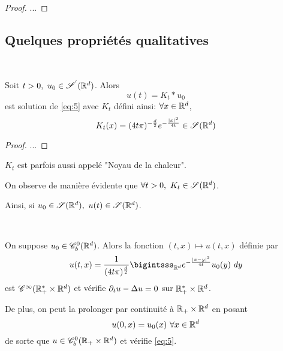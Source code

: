\documentclass[french,a4paper,10pt]{article}
\begin{document}
            \begin{proof}
                ...
            \end{proof}

        \subsection{Quelques propriétés qualitatives}\label{subsec:3.3}
            \begin{theorem} \label{thm:3.3.1}~
            
                Soit $t>0, \ u_0\in \mathscr{S}^{'}(\mathbb{R}^d)$. Alors
                \begin{equation*}
                    u(t) = K_t \ast u_0
                \end{equation*}
                est solution de \eqref{eq:5} avec $K_t$ défini ainsi: $\forall x \in \mathbb{R}^d$,
                \begin{equation*}
                    K_t(x)= (4t\pi)^{-\frac{d}{2}}e^{-\frac{\mathopen{}\left|x\right|\mathclose{}^2}{4t}} \in \mathscr{S} (\mathbb{R}^d)
                \end{equation*}
            \end{theorem}

            \begin{proof}
                ...
            \end{proof}

            \begin{remark}\label{rem:3.3.2}
                $K_t$ est parfois aussi appelé "Noyau de la chaleur".
            \end{remark}

            \begin{remark}\label{rem:3.3.3}
                On observe de manière évidente que $\forall t>0, \ K_t \in \mathscr{S}(\mathbb{R}^d)$.

                Ainsi, si $u_0 \in \mathscr{S}(\mathbb{R}^d), \ u(t) \in \mathscr{S}(\mathbb{R}^d)$.
            \end{remark}

            \begin{proposition}\ \label{prop:3.3.4}
            
                On suppose $u_0 \in \mathscr{C}^0_b(\mathbb{R}^d)$. Alors la fonction $(t,x) \mapsto  u(t,x)$ définie par 
                \begin{equation*}
                    u(t,x) = \frac{1}{(4t\pi)^\frac{d}{2}} \bigintsss_{\R^d} e^{-\frac{\n{x-y}^2}{4t}}u_0(y)\ dy
                \end{equation*}
                est $\mathscr{C}^{\infty}(\mathbb{R}^*_+ \times \mathbb{R}^d)$ et vérifie $\mathop{}\!{\partial}_tu-\Delta u=0$ sur $\mathbb{R}^*_+ \times \mathbb{R}^d$.

                De plus, on peut la prolonger par continuité à $\mathbb{R}_+ \times \mathbb{R}^d$ en posant 
                \begin{equation*}
                    u(0,x) = u_0(x) \ \forall x \in \mathbb{R}^d
                \end{equation*}
                de sorte que $u \in \mathscr{C}^0_b(\mathbb{R}_+ \times \mathbb{R}^d)$ et vérifie \eqref{eq:5}.
            \end{proposition}
\end{document}
